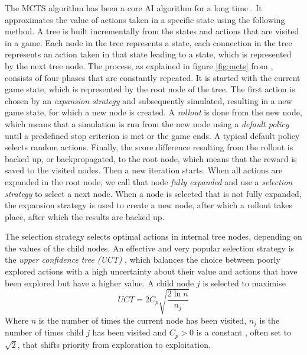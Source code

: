 \label{subsec:mcts}
The MCTS algorithm has been a core AI algorithm for a long time
\cite{browne2012survey}. It approximates the value of actions taken in a
specific state using the following method. A tree is built incrementally from
the states and actions that are visited in a game. Each node in the tree
represents a state, each connection in the tree represents an action taken in
that state leading to a state, which is represented by the next tree node. 
The process, as explained in figure \ref{fig:mcts} from \cite{browne2012survey},
consists of four phases that are constantly repeated. It
is started with the current game state, which is represented by the root node of
the tree. The first action is chosen by an \emph{expansion strategy} and
subsequently simulated, resulting in a new game state, for which a new node is
created. A \emph{rollout} is done from the new node, which means that a simulation is
run from the new node using a \emph{default policy} until a
predefined stop criterion is met or the game ends. A typical default policy
selects random actions. Finally, the score difference resulting from the rollout 
is backed up, or backpropagated, to the root node, which means that the reward
is saved to the visited nodes. Then a new iteration starts. When all actions are
expanded in the root node, we call that node \emph{fully expanded} and use a
\emph{selection strategy} to select a next node.  When a node is selected that
is not fully expanded, the expansion strategy is used to create a new
node, after which a rollout takes place, after which the results are backed up. 

The selection strategy selects optimal actions in internal tree nodes, depending
on the values of the child nodes. An effective and very popular selection
strategy is the \emph{upper confidence tree (UCT)} \cite{kocsis2006bandit}, which balances the choice 
between poorly explored actions with a high uncertainty about their value and
actions that have been explored but have a higher value. A child node $j$ is
selected to maximise
\begin{equation}
	\label{eq:uct}
	UCT = 2C_p \sqrt{\frac{2 \ln n}{n_j}}
\end{equation}
Where $n$ is the number of times the current node has been visited, $n_j$ is the
number of times child $j$ has been visited and $C_p > 0$ is a constant , often
set to $\sqrt{2}$, that shifts priority from exploration to exploitation.
	
